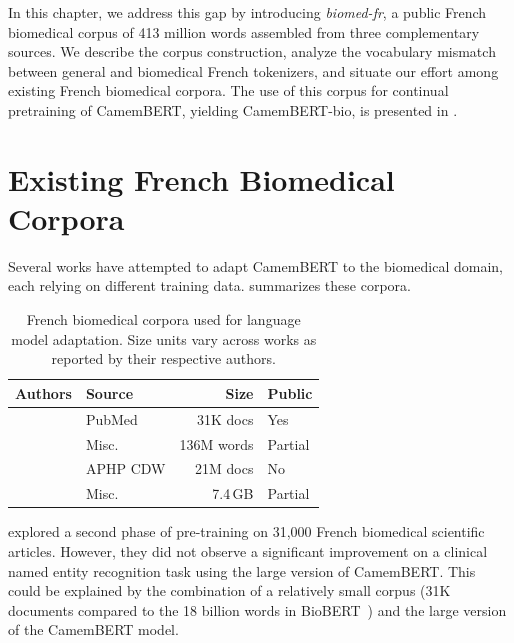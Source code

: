 \begin{reviewread}
In this chapter, we address this gap by introducing \textit{biomed-fr}, a public French biomedical corpus of 413 million words assembled from three complementary sources. We describe the corpus construction, analyze the vocabulary mismatch between general and biomedical French tokenizers, and situate our effort among existing French biomedical corpora. The use of this corpus for continual pretraining of CamemBERT, yielding CamemBERT-bio, is presented in .
\end{reviewread}


\section{Existing French Biomedical Corpora}

\begin{reviewread}
Several works have attempted to adapt CamemBERT to the biomedical domain, each relying on different training data.  summarizes these corpora.
\end{reviewread}

\begin{table}[t]
\centering
\small
\begin{tabular}{llrl}
\toprule
\textbf{Authors} & \textbf{Source} & \textbf{Size} & \textbf{Public} \\
\midrule
\citet{copara_contextualized_2020} & PubMed & 31K docs & Yes \\
\citet{le_clercq_de_lannoy_strategies_2022} & Misc. & 136M words & Partial \\
\citet{dura_learning_2022} & APHP CDW & 21M docs & No \\
\citet{labrak2023drbert} & Misc. & 7.4\,GB & Partial \\
\bottomrule
\end{tabular}
\caption{French biomedical corpora used for language model adaptation. Size units vary across works as reported by their respective authors.}
\label{tab:existing-corpora}
\end{table}

\begin{reviewread}
\citet{copara_contextualized_2020} explored a second phase of pre-training on 31,000 French biomedical scientific articles. However, they did not observe a significant improvement on a clinical named entity recognition task using the large version of CamemBERT. This could be explained by the combination of a relatively small corpus (31K documents compared to the 18 billion words in BioBERT~\citep{lee_biobert_2019}) and the large version of the CamemBERT model.
\end{reviewread}

